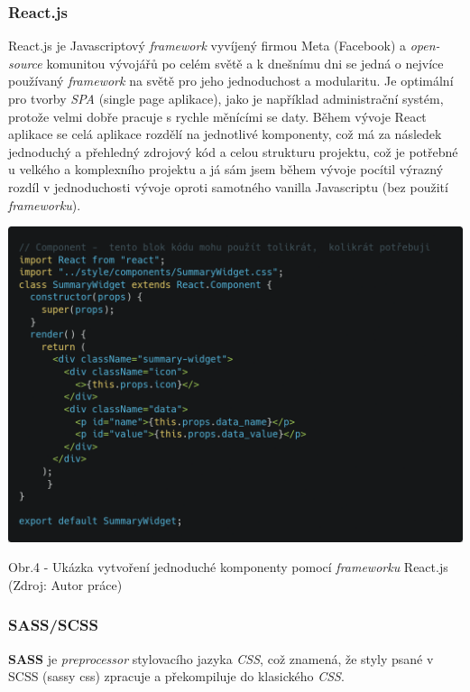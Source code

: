 \documentclass[12pt,a4paper]{report}
\begin{document}
  \subsubsection{React.js}
  React.js je Javascriptový \emph{framework} vyvíjený firmou Meta (Facebook) a \emph{open-source} komunitou
  vývojářů po celém světě a k dnešnímu dni se jedná o nejvíce používaný \emph{framework} na světě pro
  jeho jednoduchost a modularitu.
  Je optimální pro tvorby \emph{SPA} (single page aplikace), jako je například administrační systém, protože
  velmi dobře pracuje s rychle měnícími se daty. Během vývoje React aplikace se celá aplikace
  rozdělí na jednotlivé komponenty, což má za následek jednoduchý a přehledný zdrojový kód a
  celou strukturu projektu, což je potřebné u velkého a komplexního projektu a já sám jsem během
  vývoje pocítil výrazný rozdíl v jednoduchosti vývoje oproti samotného vanilla Javascriptu (bez
  použití \emph{frameworku}).

  \vspace*{0.5cm}
  \noindent\includegraphics[width=\linewidth]{reactCodeblock.png}
  \begin{center}
    Obr.4 - Ukázka vytvoření jednoduché komponenty pomocí \emph{frameworku} React.js \\
    (Zdroj: Autor práce)
  \end{center}

  \subsubsection{SASS/SCSS}
  \textbf{SASS} je \emph{preprocessor} stylovacího jazyka \emph{CSS}, což znamená, že styly psané v SCSS (sassy css)
  zpracuje a překompiluje do klasického \emph{CSS}.
  
\end{document}
